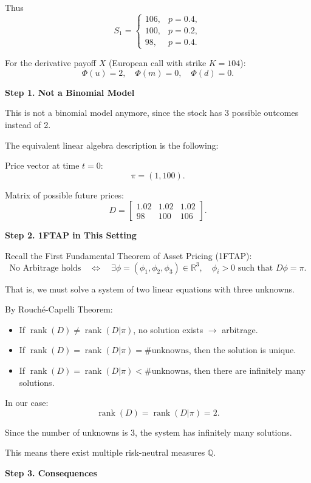 \documentclass[12pt,a4paper]{article}
\theoremstyle{definition}
\newcommand{\R}{\mathbb{R}}
\newcommand{\Q}{\mathbb{Q}}
\begin{document}
Thus
\[
S_1 = \begin{cases}
106, & p = 0.4, \\
100, & p = 0.2, \\
98, & p = 0.4.
\end{cases}
\]

For the derivative payoff $X$ (European call with strike $K = 104$):
\[
\Phi(u) = 2, \quad \Phi(m) = 0, \quad \Phi(d) = 0.
\]

\textbf{Step 1. Not a Binomial Model}

This is not a binomial model anymore, since the stock has 3 possible outcomes instead of 2.

The equivalent linear algebra description is the following:

Price vector at time $t = 0$:
\[
\pi = (1, 100).
\]

Matrix of possible future prices:
\[
D = \begin{bmatrix}
1.02 & 1.02 & 1.02 \\
98 & 100 & 106
\end{bmatrix}.
\]

\textbf{Step 2. 1FTAP in This Setting}

Recall the First Fundamental Theorem of Asset Pricing (1FTAP):
\[
\text{No Arbitrage holds} \quad \Leftrightarrow \quad \exists \phi = (\phi_1, \phi_2, \phi_3) \in \R^3, \quad \phi_i > 0 \text{ such that } D\phi = \pi.
\]

That is, we must solve a system of two linear equations with three unknowns.

By Rouché-Capelli Theorem:
\begin{itemize}
\item If $\operatorname{rank}(D) \neq \operatorname{rank}(D|\pi)$, no solution exists $\rightarrow$ arbitrage.
\item If $\operatorname{rank}(D) = \operatorname{rank}(D|\pi) = \text{\# unknowns}$, then the solution is unique.
\item If $\operatorname{rank}(D) = \operatorname{rank}(D|\pi) < \text{\# unknowns}$, then there are infinitely many solutions.
\end{itemize}

In our case:
\[
\operatorname{rank}(D) = \operatorname{rank}(D|\pi) = 2.
\]

Since the number of unknowns is 3, the system has infinitely many solutions.

This means there exist multiple risk-neutral measures $\Q$.

\textbf{Step 3. Consequences}
\end{document}
